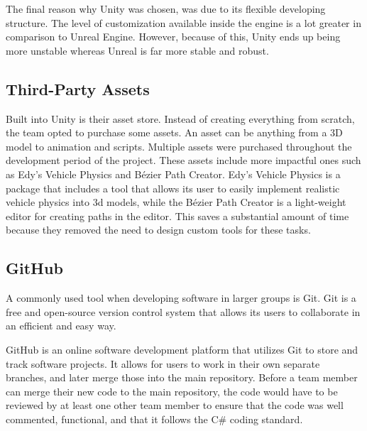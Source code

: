     The final reason why Unity was chosen, was due to its flexible developing structure. The level of customization available inside the engine is a lot greater in comparison to Unreal Engine. However, because of this, Unity ends up being more unstable whereas Unreal is far more stable and robust.


\subsection{Third-Party Assets}
    Built into Unity is their asset store. Instead of creating everything from scratch, the team opted to purchase some assets. An asset can be anything from a 3D model to animation and scripts. Multiple assets were purchased throughout the development period of the project. These assets include more impactful ones such as Edy's Vehicle Physics and Bézier Path Creator\cite{bpc}. Edy's Vehicle Physics is a package that includes a tool that allows its user to easily implement realistic vehicle physics into 3d models, while the Bézier Path Creator is a light-weight editor for creating paths in the editor. This saves a substantial amount of time because they removed the need to design custom tools for these tasks.

\subsection{GitHub}
    A commonly used tool when developing software in larger groups is Git\cite{git}. Git is a free and open-source version control system that allows its users to collaborate in an efficient and easy way. 

    GitHub\cite{github} is an online software development platform that utilizes Git to store and track software projects. It allows for users to work in their own separate branches, and later merge those into the main repository. Before a team member can merge their new code to the main repository, the code would have to be reviewed by at least one other team member to ensure that the code was well commented, functional, and that it follows the C\# coding standard.


